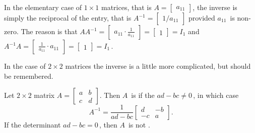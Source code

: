 In the elementary case of \(1\times1\) matrices, that is \(A=\begin{bmatrix} a_{11} \end{bmatrix}\), the inverse is simply the reciprocal of the entry, that is \(A^{-1}=\begin{bmatrix} 1/a_{11} \end{bmatrix}\) provided \(a_{11}\)~is non-zero.
The reason is that \(AA^{-1}=\begin{bmatrix} a_{11}\cdot\frac1{a_{11}} \end{bmatrix}=\begin{bmatrix} 1 \end{bmatrix}=I_1\) and  \(A^{-1}A=\begin{bmatrix} \frac1{a_{11}}\cdot a_{11} \end{bmatrix}=\begin{bmatrix} 1 \end{bmatrix}=I_1\)\,.

In the case of \(2\times2\) matrices the inverse is a little more complicated, but should be remembered.

\begin{theorem} \label{thm:2x2det} 
Let \(2\times2\) matrix \(A=\begin{bmatrix} a&b\\c&d \end{bmatrix}\). Then \(A\)~is  if the  \(ad-bc\neq0\)\,, in which case
\begin{equation}
A^{-1}=\frac1{ad-bc}\begin{bmatrix} d&-b\\-c&a \end{bmatrix}.
\label{eq:2x2inv}
\end{equation}
If the determinant \(ad-bc=0\)\,, then \(A\)~is not .
\end{theorem}

